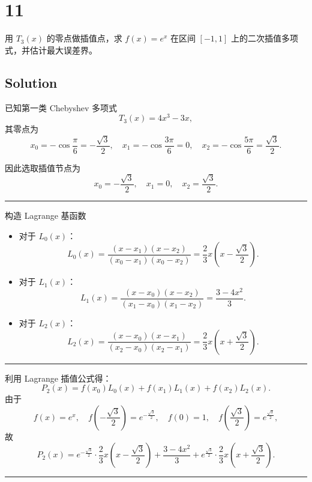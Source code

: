 \documentclass[11pt]{article}
\begin{document}
    \section{11}\label{section}

用 \(T_3(x)\) 的零点做插值点，求 \(f(x) = e^x\) 在区间 \([-1, 1]\)
上的二次插值多项式，并估计最大误差界。

    \subsection{Solution}\label{solution}

已知第一类 Chebyshev 多项式 \[
T_3(x)=4x^3-3x,
\] 其零点为\\
\[
x_0=-\cos\frac{\pi}{6}=-\frac{\sqrt{3}}{2},\quad x_1=-\cos\frac{3\pi}{6}=0,\quad x_2=-\cos\frac{5\pi}{6}=\frac{\sqrt{3}}{2}.
\]

因此选取插值节点为 \[
x_0=-\frac{\sqrt{3}}{2},\quad x_1=0,\quad x_2=\frac{\sqrt{3}}{2}.
\]

\begin{center}\rule{0.5\linewidth}{0.5pt}\end{center}

构造 Lagrange 基函数

\begin{itemize}
\item
  对于 \(L_0(x)\)： \[
  L_0(x)=\frac{(x-x_1)(x-x_2)}{(x_0-x_1)(x_0-x_2)}
  =\frac{2}{3}x\left(x-\frac{\sqrt{3}}{2}\right).
  \]
\item
  对于 \(L_1(x)\)： \[
  L_1(x)=\frac{(x-x_0)(x-x_2)}{(x_1-x_0)(x_1-x_2)}
  =\frac{3-4x^2}{3}.
  \]
\item
  对于 \(L_2(x)\)： \[
  L_2(x)=\frac{(x-x_0)(x-x_1)}{(x_2-x_0)(x_2-x_1)}
  =\frac{2}{3}x\left(x+\frac{\sqrt{3}}{2}\right).
  \]
\end{itemize}

\begin{center}\rule{0.5\linewidth}{0.5pt}\end{center}

利用 Lagrange 插值公式得： \[
P_2(x)=f(x_0)L_0(x)+f(x_1)L_1(x)+f(x_2)L_2(x).
\] 由于 \[
f(x)=e^x,\quad f\left(-\frac{\sqrt{3}}{2}\right)=e^{-\frac{\sqrt{3}}{2}},\quad f(0)=1,\quad f\left(\frac{\sqrt{3}}{2}\right)=e^{\frac{\sqrt{3}}{2}},
\] 故 \[
P_2(x)=e^{-\frac{\sqrt{3}}{2}}\cdot\frac{2}{3}x\left(x-\frac{\sqrt{3}}{2}\right)
+\frac{3-4x^2}{3}
+e^{\frac{\sqrt{3}}{2}}\cdot\frac{2}{3}x\left(x+\frac{\sqrt{3}}{2}\right).
\]

\begin{center}\rule{0.5\linewidth}{0.5pt}\end{center}
\end{document}
